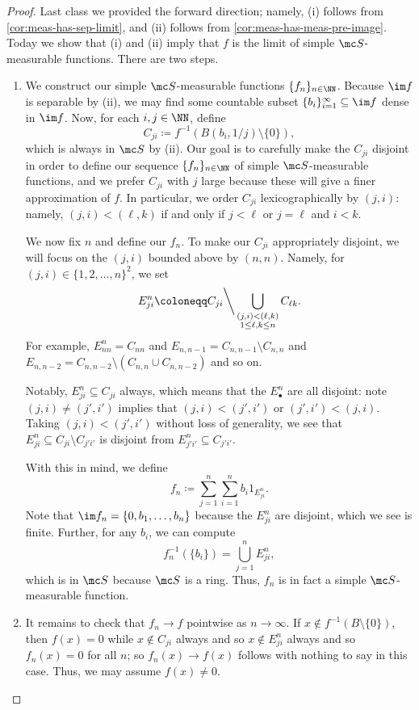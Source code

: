 \documentclass[../notes.tex]{subfiles}
\begin{document}
\begin{proof}
	Last class we provided the forward direction; namely, (i) follows from \autoref{cor:meas-has-sep-limit}, and (ii) follows from \autoref{cor:meas-has-meas-pre-image}. Today we show that (i) and (ii) imply that $f$ is the limit of simple $\mc S$-measurable functions. There are two steps.
	\begin{enumerate}
		\item We construct our simple $\mc S$-measurable functions $\{f_n\}_{n\in\NN}$. Because $\im f$ is separable by (ii), we may find some countable subset $\{b_i\}_{i=1}^\infty\subseteq\im f$ dense in $\im f$. Now, for each $i,j\in\NN$, define
		\[C_{ji}\coloneqq f^{-1}(B(b_i,1/j)\setminus\{0\}),\]
		which is always in $\mc S$ by (ii). Our goal is to carefully make the $C_{ji}$ disjoint in order to define our sequence $\{f_n\}_{n\in\NN}$ of simple $\mc S$-measurable functions, and we prefer $C_{ji}$ with $j$ large because these will give a finer approximation of $f$. In particular, we order $C_{ji}$ lexicographically by $(j,i)$: namely, $(j,i)<(\ell,k)$ if and only if $j<\ell$ or $j=\ell$ and $i<k$.
	
		We now fix $n$ and define our $f_n$. To make our $C_{ji}$ appropriately disjoint, we will focus on the $(j,i)$ bounded above by $(n,n)$. Namely, for $(j,i)\in\{1,2,\ldots,n\}^2$, we set
		\[E_{ji}^n\coloneqq C_{ji}{\mathbin\bigg\backslash}\bigcup_{\substack{(j,i)<(\ell,k)\\1\le\ell,k\le n}}C_{\ell k}.\]
		For example, $E_{nn}^n=C_{nn}$ and $E_{n,n-1}=C_{n,n-1}\setminus C_{n,n}$ and $E_{n,n-2}=C_{n,n-2}\setminus(C_{n,n}\cup C_{n,n-2})$ and so on.
	
		Notably, $E_{ji}^n\subseteq C_{ji}$ always, which means that the $E_{\bullet}^n$ are all disjoint: note $(j,i)\ne(j',i')$ implies that $(j,i)<(j',i')$ or $(j',i')<(j,i)$. Taking $(j,i)<(j',i')$ without loss of generality, we see that $E_{ji}^n\subseteq C_{ji}\setminus C_{j'i'}$ is disjoint from $E_{j'i'}^n\subseteq C_{j'i'}$.
		
		With this in mind, we define
		\[f_n\coloneqq\sum_{j=1}^n\sum_{i=1}^nb_i1_{E_{ji}^n}.\]
		Note that $\im f_n=\{0,b_1,\ldots,b_n\}$ because the $E_{ji}^n$ are disjoint, which we see is finite. Further, for any $b_i$, we can compute
		\[f_n^{-1}(\{b_i\})=\bigcup_{j=1}^nE_{ji}^n,\]
		which is in $\mc S$ because $\mc S$ is a ring. Thus, $f_n$ is in fact a simple $\mc S$-measurable function.
		
		\item It remains to check that $f_n\to f$ pointwise as $n\to\infty$. If $x\notin f^{-1}(B\setminus\{0\})$, then $f(x)=0$ while $x\notin C_{ji}$ always and so $x\notin E^n_{ji}$ always and so $f_n(x)=0$ for all $n$; so $f_n(x)\to f(x)$ follows with nothing to say in this case. Thus, we may assume $f(x)\ne0$.


\end{enumerate}
\end{proof}
\end{document}
